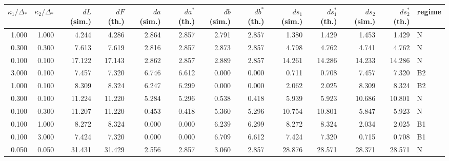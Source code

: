 \begin{tabular}{rrrrrrrrrrrrl}
\toprule
$\kappa_1/\Delta_\ast$ & $\kappa_2/\Delta_\ast$ & $dL$ (sim.) & $dF$ (th.) & $da$ (sim.) & $da^\ast$ (th.) & $db$ (sim.) & $db^\ast$ (th.) & $ds_1$ (sim.) & $ds_1^\ast$ (th.) & $ds_2$ (sim.) & $ds_2^\ast$ (th.) & regime \\
\midrule
1.000 & 1.000 & 4.244 & 4.286 & 2.864 & 2.857 & 2.791 & 2.857 & 1.380 & 1.429 & 1.453 & 1.429 & N \\
0.300 & 0.300 & 7.613 & 7.619 & 2.816 & 2.857 & 2.873 & 2.857 & 4.798 & 4.762 & 4.741 & 4.762 & N \\
0.100 & 0.100 & 17.122 & 17.143 & 2.862 & 2.857 & 2.889 & 2.857 & 14.261 & 14.286 & 14.233 & 14.286 & N \\
3.000 & 0.100 & 7.457 & 7.320 & 6.746 & 6.612 & 0.000 & 0.000 & 0.711 & 0.708 & 7.457 & 7.320 & B2 \\
1.000 & 0.100 & 8.309 & 8.324 & 6.247 & 6.299 & 0.000 & 0.000 & 2.062 & 2.025 & 8.309 & 8.324 & B2 \\
0.300 & 0.100 & 11.224 & 11.220 & 5.284 & 5.296 & 0.538 & 0.418 & 5.939 & 5.923 & 10.686 & 10.801 & N \\
0.100 & 0.300 & 11.207 & 11.220 & 0.453 & 0.418 & 5.360 & 5.296 & 10.754 & 10.801 & 5.847 & 5.923 & N \\
0.100 & 1.000 & 8.272 & 8.324 & 0.000 & 0.000 & 6.239 & 6.299 & 8.272 & 8.324 & 2.034 & 2.025 & B1 \\
0.100 & 3.000 & 7.424 & 7.320 & 0.000 & 0.000 & 6.709 & 6.612 & 7.424 & 7.320 & 0.715 & 0.708 & B1 \\
0.050 & 0.050 & 31.431 & 31.429 & 2.556 & 2.857 & 3.060 & 2.857 & 28.876 & 28.571 & 28.371 & 28.571 & N \\
\bottomrule
\end{tabular}
